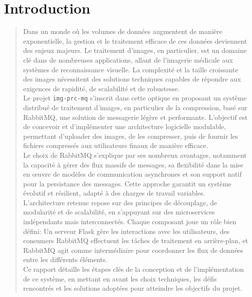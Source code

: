 \documentclass[12pt]{article}
\begin{document}


\hfill
\thispagestyle{empty}

\tableofcontents

\newpage

\section{Introduction}
\begin{quote}
    Dans un monde où les volumes de données augmentent de manière exponentielle, la gestion et le traitement efficace de ces données deviennent des enjeux majeurs. Le traitement d'images, en particulier, est un domaine clé dans de nombreuses applications, allant de l'imagerie médicale aux systèmes de reconnaissance visuelle. La complexité et la taille croissante des images nécessitent des solutions techniques capables de répondre aux exigences de rapidité, de scalabilité et de robustesse. \\

    Le projet \texttt{img-prc-mq} s'inscrit dans cette optique en proposant un système distribué de traitement d'images, en particulier de la compression, basé sur RabbitMQ, une solution de messagerie légère et performante. L'objectif est de concevoir et d'implémenter une architecture logicielle modulable, permettant d'uploader des images, de les compresser, puis de fournir les fichiers compressés aux utilisateurs finaux de manière efficace. \\

    Le choix de RabbitMQ s'explique par ses nombreux avantages, notamment la capacité à gérer des flux massifs de messages, sa flexibilité dans la mise en œuvre de modèles de communication asynchrones et son support natif pour la persistance des messages. Cette approche garantit un système évolutif et résilient, adapté à des charges de travail variables. \\

    L'architecture retenue repose sur des principes de découplage, de modularité et de scalabilité, en s'appuyant sur des microservices indépendants mais interconnectés. Chaque composant joue un rôle bien défini: Un serveur Flask gère les interactions avec les utilisateurs, des consumers RabbitMQ effectuent les tâches de traitement en arrière-plan, et RabbitMQ agit comme intermédiaire pour coordonner les flux de données entre les différents éléments. \\

    Ce rapport détaille les étapes clés de la conception et de l'implémentation de ce système, en mettant en avant les choix techniques, les défis rencontrés et les solutions adoptées pour atteindre les objectifs du projet.
\end{quote}
\end{document}
